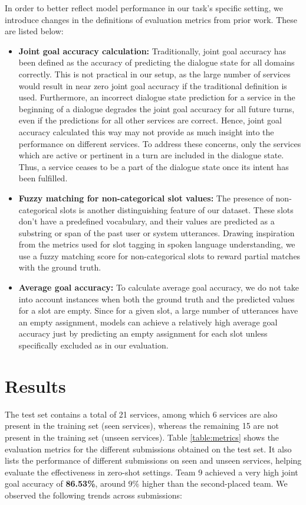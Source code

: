 In order to better reflect model performance in our task's specific setting, we introduce changes in the definitions of evaluation metrics from prior work. These are listed below:
\begin{itemize}[leftmargin=*]
    \item \textbf{Joint goal accuracy calculation:} Traditionally, joint goal accuracy has been defined as the accuracy of predicting the dialogue state for all domains correctly. This is not practical in our setup, as the large number of services would result in near zero joint goal accuracy if the traditional definition is used. Furthermore, an incorrect dialogue state prediction for a service in the beginning of a dialogue degrades the joint goal accuracy for all future turns, even if the predictions for all other services are correct. Hence, joint goal accuracy calculated this way may not provide as much insight into the performance on different services. To address these concerns, only the services which are active or pertinent in a turn are included in the dialogue state. Thus, a service ceases to be a part of the dialogue state once its intent has been fulfilled. 

    \item \textbf{Fuzzy matching for non-categorical slot values:} The presence of non-categorical slots is another distinguishing feature of our dataset. These slots don't have a predefined vocabulary, and their values are predicted as a substring or span of the past user or system utterances. Drawing inspiration from the metrics used for slot tagging in spoken language understanding, we use a fuzzy matching score for non-categorical slots to reward partial matches with the ground truth.

    \item \textbf{Average goal accuracy:} To calculate average goal accuracy, we do not take into account instances when both the ground truth and the predicted values for a slot are empty. Since for a given slot, a large number of utterances have an empty assignment, models can achieve a relatively high average goal accuracy just by predicting an empty assignment for each slot unless specifically excluded as in our evaluation.
\end{itemize}

\section{Results}

The test set contains a total of 21 services, among which 6 services are also present in the training set (seen services), whereas the remaining 15 are not present in the training set (unseen services). Table \ref{table:metrics} shows the evaluation metrics for the different submissions obtained on the test set. It also lists the performance of different submissions on seen and unseen services, helping evaluate the effectiveness in zero-shot settings. Team 9 achieved a very high joint goal accuracy of \textbf{86.53\%}, around 9\% higher than the second-placed team. We observed the following trends across submissions:

